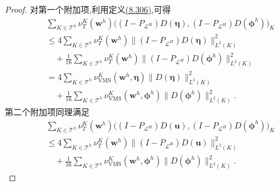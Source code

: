 \begin{proof}
对第一个附加项,利用定义\hyperref[eq:vms-coarse-projection-local-viscosity]{(8.306)},可得
\[
\begin{aligned}
 &\sum_{K\in\mathcal T^h}\nu_T^K(\bm w^h)
   \bigl((I-P_{\mathcal L^H})D(\symbf{\eta}),
         (I-P_{\mathcal L^H})D(\symbf{\phi}^h)\bigr)_K\\
 &\le 4\sum_{K\in\mathcal T^h}\nu_T^K(\bm w^h)
       \|(I-P_{\mathcal L^H})D(\symbf{\eta})\|_{L^2(K)}^2\\
 &\quad+\frac1{16}\sum_{K\in\mathcal T^h}\nu_T^K(\bm w^h)
       \|(I-P_{\mathcal L^H})D(\symbf{\phi}^h)\|_{L^2(K)}^2\\
 &=4\sum_{K\in\mathcal T^h}\nu_{\mathrm{VMS}}^K(\bm w^h,\symbf{\eta})
       \|D(\symbf{\eta})\|_{L^2(K)}^2\\
 &\quad+\frac1{16}\sum_{K\in\mathcal T^h}
       \nu_{\mathrm{VMS}}^K(\bm w^h,\symbf{\phi}^h)
       \|D(\symbf{\phi}^h)\|_{L^2(K)}^2.
\end{aligned}
\]
第二个附加项同理满足
\[
\begin{aligned}
 &\sum_{K\in\mathcal T^h}\nu_T^K(\bm w^h)
   \bigl((I-P_{\mathcal L^H})D(\bm u),
         (I-P_{\mathcal L^H})D(\symbf{\phi}^h)\bigr)_K\\
 &\le 4\sum_{K\in\mathcal T^h}\nu_T^K(\bm w^h)
       \|(I-P_{\mathcal L^H})D(\bm u)\|_{L^2(K)}^2\\
 &\quad+\frac1{16}\sum_{K\in\mathcal T^h}
       \nu_{\mathrm{VMS}}^K(\bm w^h,\symbf{\phi}^h)
       \|D(\symbf{\phi}^h)\|_{L^2(K)}^2.
\end{aligned}
\]


\end{proof}
